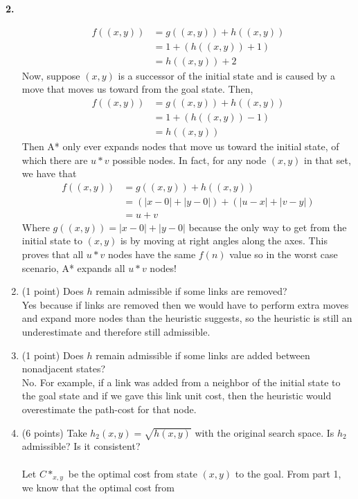 \documentclass[12pt]{amsart}
\newenvironment{statement}[1]{\smallskip\noindent\color[rgb]{0.0,0.0,0.0} {\bf #1.}}{}
\theoremstyle{definition}
\theoremstyle{remark}
\newcommand{\1}{\mathds{1}}
\begin{document}
\begin{statement}{2}
\begin{enumerate}
    \begin{align*}
        f((x, y)) &= g((x, y)) + h((x, y)) \\ 
        &= 1 + (h((x, y)) + 1)\\ 
        &= h((x, y)) + 2
    \end{align*}
    Now, suppose $(x, y)$ is a successor of the initial state and is caused by a move that moves us toward from the goal state. Then,
    \begin{align*}
        f((x, y)) &= g((x, y)) + h((x, y)) \\ 
        &= 1 + (h((x, y)) - 1)\\ 
        &= h((x, y))
    \end{align*}
    Then A* only ever expands nodes that move us toward the initial state, of which there are $u*v$ possible nodes. In fact, for any node $(x, y)$ in that set, we have that 
    \begin{align*}
        f((x, y)) &= g((x, y)) + h((x, y))\\ 
        &= (|x - 0| + |y - 0|) + (|u - x| + |v - y|) \\ 
        &= u + v
    \end{align*}
    Where $g((x, y)) = |x - 0| + |y - 0|$ because the only way to get from the initial state to $(x, y)$ is by moving at right angles along the axes. This proves that all $u*v$ nodes have 
    the same $f(n)$ value so in the worst case scenario, A* expands all $u*v$ nodes!
    \item (1 point) Does $h$ remain admissible if some links are removed?
    \\ Yes because if links are removed then we would have to perform extra moves and expand more nodes than the heuristic suggests, so the heuristic is still an underestimate and therefore still 
    admissible. 
    \item (1 point) Does $h$ remain admissible if some links are added between nonadjacent states? %
    \\ No. For example, if a link was added from a neighbor of the initial state to the goal state and if we gave this link unit cost, then 
    the heuristic would overestimate the path-cost for that node. 
    \item (6 points) Take $h_2(x,y) = \sqrt{h(x,y)}$ with the original search space. Is $h_2$ admissible? Is it consistent?\\ 
    \\ Let $C*_{x, y}$ be the optimal cost from state $(x, y)$ to the goal. From part 1, we know that the optimal cost from 

\end{enumerate}
\end{statement}
\end{document}
